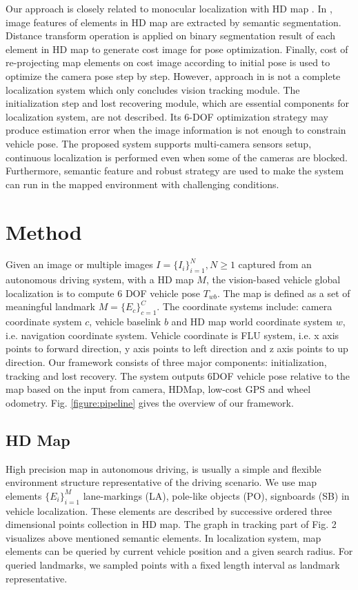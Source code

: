 \documentclass[letterpaper, 10 pt, conference]{ieeeconf}
\begin{document}
Our approach is closely related to monocular localization with HD map \cite{paulsmonocular}. 
In \cite{paulsmonocular}, image features of elements in HD map are extracted by semantic segmentation. Distance transform operation is applied on binary segmentation result of each element in HD map to generate cost image for pose optimization. Finally, cost of re-projecting map elements on cost image according to initial pose is used to optimize the camera pose step by step. However, approach in \cite{paulsmonocular} is not a complete localization system which only concludes vision tracking module. The initialization step and lost recovering module, which are essential components for localization system, are not described. Its 6-DOF optimization strategy may produce estimation error when the image information is not enough to constrain vehicle pose. The proposed system supports multi-camera sensors setup, continuous localization is performed even when some of the cameras are blocked. Furthermore, semantic feature and robust strategy are used to make the system can run in the mapped environment with challenging conditions.


\section{Method}

Given an image or multiple images $I=\{I_i\}_{i=1}^N, N \geq 1$ captured from an autonomous driving system, with a HD map $M$, the vision-based vehicle global localization is to compute 6 DOF vehicle pose $T_{wb} $. The map is defined as a set of meaningful landmark $M = \{ E_c \}_{c=1}^C$. The coordinate systems include: camera coordinate system $c$, vehicle baselink $b$ and HD map world coordinate system $w$, i.e. navigation coordinate system. Vehicle coordinate is FLU system, i.e. x axis points to forward direction, y axis points to left direction and z axis points to up direction.  Our framework consists of three major components: initialization, tracking and lost recovery. The system outputs 6DOF vehicle pose relative to the map based on the input from camera, HDMap, low-cost GPS and wheel odometry. Fig. \ref{figure:pipeline} gives the overview of our framework.

\subsection{HD Map}

High precision map in autonomous driving, is usually a simple and flexible environment structure representative of the driving scenario. We use map elements $\{ E_i \}_{i=1}^M$ lane-markings (LA), pole-like objects (PO), signboards (SB) in vehicle localization. These elements are described by successive ordered three dimensional points collection in HD map. The graph in tracking part of Fig. 2 visualizes above mentioned semantic elements. In localization system, map elements can be queried by current vehicle position and a given search radius. For queried landmarks, we sampled points with a fixed length interval as landmark representative. 
\end{document}
